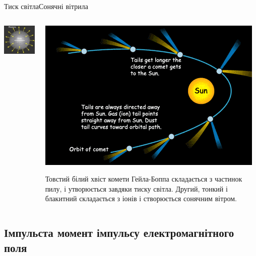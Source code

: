 \documentclass[onlytextwidth]{beamer}
\begin{document}
\begin{frame}{Тиск світла}{Сонячні вітрила}
\begin{onlyenv}
\begin{columns}
\begin{column}{0.5\linewidth}
				\includegraphics[width=0.75\linewidth]{Star}
			\end{column}
			\begin{column}{0.5\linewidth}\centering
				\includegraphics[width=0.75\linewidth]{Comet}

				\begin{block}{}\tiny\centering
					Товстий білий хвіст комети Гейла-Боппа складається з частинок пилу, і утворюється завдяки тиску світла. Другий, тонкий і блакитний складається з іонів і створюється сонячним вітром.
				\end{block}
			\end{column}
		\end{columns}
	\end{onlyenv}
\end{frame}



\subsection{Імпульста момент імпульсу електромагнітного поля}
\end{document}
